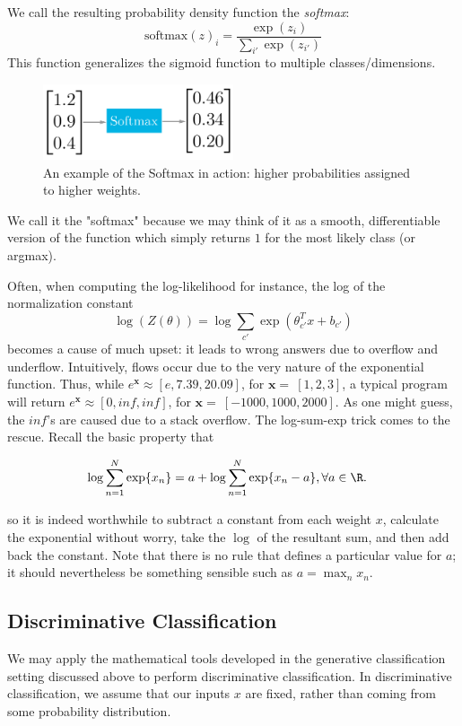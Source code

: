 \documentclass{article}
\renewcommand{\v}{\boldsymbol}
\begin{document}
\smallskip

We call the resulting probability density function the \emph{softmax}: 
$$ \text{softmax}(z)_i = \frac{ \exp(z_i) }{ \sum_{i'} \exp(z_{i'})} $$
This function generalizes the sigmoid function to multiple classes/dimensions. 
\begin{figure}[h]
\centering
\includegraphics[width=0.5\textwidth]{softmax.png}
\caption{An example of the Softmax in action: higher probabilities assigned to higher weights.}
\end{figure}
We call it the "softmax" because we may think of it as a smooth, differentiable version of the function which simply returns $1$ for the most likely class (or argmax). 

Often, when computing the log-likelihood for instance, the log of the normalization constant $$ \log(Z(\theta)) = \log \sum_{c'} \exp(\theta_{c'}^T x + b_{c'}) $$ becomes a cause of much upset: it leads to wrong answers due to overflow and underflow. Intuitively, flows occur due to the very nature of the exponential function. Thus, while $e^{\v x} \approx [e, 7.39, 20.09] $, for $\v x =  \ [1,2,3] $, a typical program will return $e^{\v x} \approx  [0, inf, inf] $, for $\v x = \ [-1000,1000,2000] $. As one might guess, the $inf$'s are caused due to a stack overflow. 
\newline The log-sum-exp trick comes to the rescue.  Recall the basic property that

\begin{align*} \log\sum_{n=1}^N\exp\{x_n\} &= a + \log\sum_{n=1}^N\exp\{x_n-a\}, \forall a \in \R.
\end{align*}

so it is indeed worthwhile to subtract a constant from each weight $x$, calculate the exponential without worry, take the $\log$ of the resultant sum, and then add back the constant. Note that there is no rule that defines a particular value for $a$; it should nevertheless be something sensible such as $a = \max_n x_n$.

\subsection{Discriminative Classification}
We may apply the mathematical tools developed in the generative classification setting discussed above to perform discriminative classification. In discriminative classification, we assume that our inputs $x$ are fixed, rather than coming from some probability distribution.
\end{document}
